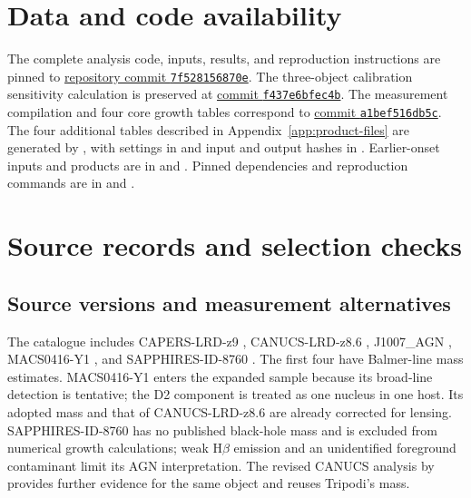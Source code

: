 \documentclass[pdflatex,sn-basic]{sn-jnl}
\begin{document}
\par{}
\section*{Data and code availability}

The complete analysis code, inputs, results, and reproduction instructions are
pinned to \href{https://github.com/nniickels/highz-accretion-atlas/tree/7f528156870eff7bb3d44114f510cbc10edbaaf6}{repository commit \texttt{7f528156870e}}.
The three-object calibration sensitivity calculation is preserved at
\href{https://github.com/nniickels/highz-accretion-atlas/tree/f437e6bfec4b0f356006e153c5dabd9b96e3423b}{commit \texttt{f437e6bfec4b}}.
The measurement compilation and four core growth tables correspond to
\href{https://github.com/nniickels/highz-accretion-atlas/tree/a1bef516db5c76a92b6848eb12bccabdeb5804b9}{commit \texttt{a1bef516db5c}}.
The four additional tables described in Appendix~\ref{app:product-files} are
generated by , with settings in
 and input and output
hashes in .
Earlier-onset inputs and products are in
 and .
Pinned dependencies and reproduction commands are in
 and .
\par

\appendix
\makeatletter
\def\sectionprefix{Appendix~}
\renewcommand{\@seccntformat}[1]{\ifcsname #1prefix\endcsname\csname #1prefix\endcsname\fi\csname the#1\endcsname\quad}
\makeatother
\section{Source records and selection checks}
\label{app:sources}

\subsection{Source versions and measurement alternatives}

The catalogue includes CAPERS-LRD-z9 \citep{taylor25expansion},
CANUCS-LRD-z8.6 \citep{tripodi25expansion}, J1007\_AGN
\citep{schindler25expansion}, MACS0416-Y1 \citep{takechi26expansion}, and
SAPPHIRES-ID-8760 \citep{fudamoto25expansion}. The first four have Balmer-line
mass estimates. MACS0416-Y1 enters the expanded sample because its broad-line
detection is tentative; the D2 component is treated as one nucleus in one
host. Its adopted mass and that of CANUCS-LRD-z8.6 are already corrected for
lensing. SAPPHIRES-ID-8760 has no published black-hole mass and is excluded
from numerical growth calculations; weak H$\beta$ emission and an unidentified
foreground contaminant limit its AGN interpretation. The revised CANUCS
analysis by \citet{morishita2026context} provides further evidence for the
same object and reuses Tripodi's mass.
\end{document}
